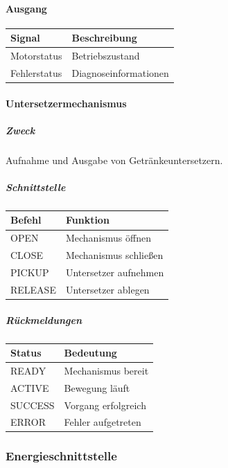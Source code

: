 \documentclass[
  a4paper,
  12pt,
  DIV=12,        %
  parskip=half,  %
  headings=small %
]{scrartcl}
\theoremstyle{definition}
\theoremstyle{definition}
\begin{document}
\paragraph{Ausgang}\label{ausgang}

\begin{longtable}[]{@{}ll@{}}
\toprule\noalign{}
Signal & Beschreibung \\
\midrule\noalign{}
\endhead
\bottomrule\noalign{}
\endlastfoot
Motorstatus & Betriebszustand \\
Fehlerstatus & Diagnoseinformationen \\
\end{longtable}

\paragraph{Untersetzermechanismus}\label{untersetzermechanismus-1}

\subparagraph{Zweck}\label{zweck-4}

Aufnahme und Ausgabe von Getränkeuntersetzern.

\subparagraph{Schnittstelle}\label{schnittstelle-4}

\begin{longtable}[]{@{}ll@{}}
\toprule\noalign{}
Befehl & Funktion \\
\midrule\noalign{}
\endhead
\bottomrule\noalign{}
\endlastfoot
OPEN & Mechanismus öffnen \\
CLOSE & Mechanismus schließen \\
PICKUP & Untersetzer aufnehmen \\
RELEASE & Untersetzer ablegen \\
\end{longtable}

\subparagraph{Rückmeldungen}\label{ruxfcckmeldungen}

\begin{longtable}[]{@{}ll@{}}
\toprule\noalign{}
Status & Bedeutung \\
\midrule\noalign{}
\endhead
\bottomrule\noalign{}
\endlastfoot
READY & Mechanismus bereit \\
ACTIVE & Bewegung läuft \\
SUCCESS & Vorgang erfolgreich \\
ERROR & Fehler aufgetreten \\
\end{longtable}

\subsubsection{Energieschnittstelle}\label{energieschnittstelle}
\end{document}

